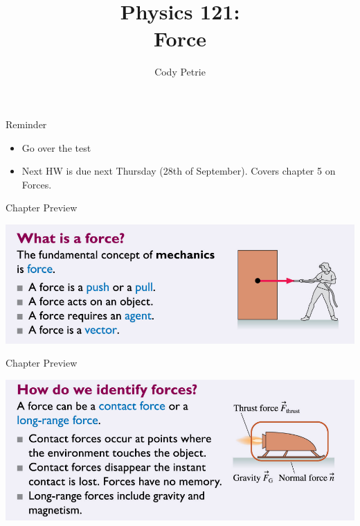 \documentclass{beamer}
\title[{\color{white}{Chapters 5.1-3}}]{Physics 121: \\ Force}
\author{Cody Petrie}
\institute{Mesa Community College}
\date{}
\begin{document}
\begin{frame}
\titlepage
\end{frame}



\begin{frame}{Reminder}
\begin{itemize}
   \item Go over the test
   \item Next HW is due next Thursday (28th of September). Covers chapter 5 on Forces.
\end{itemize}
\end{frame}

\begin{frame}{Chapter Preview}
\begin{center}
   \includegraphics[width=\textwidth]{../figures/05_preview_01.png}
\end{center}
\end{frame}

\begin{frame}{Chapter Preview}
\begin{center}
   \includegraphics[width=\textwidth]{../figures/05_preview_02.png}
\end{center}
\end{frame}
\end{document}
